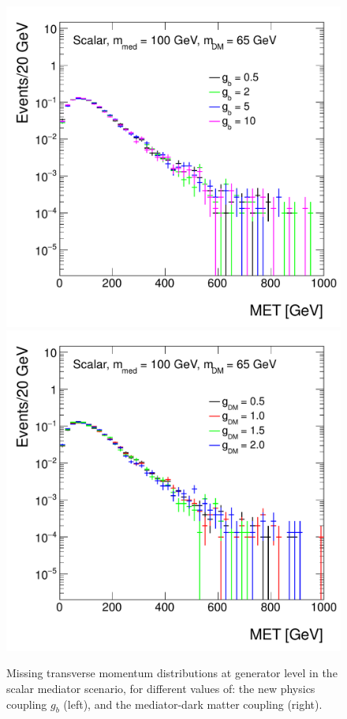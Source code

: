\begin{figure}[hbpt!]
	\begin{center}
		\includegraphics[width=0.75\linewidth]{figures/EW/monoH/s_gb_65_100_04_MET_et_Log}\\
		\includegraphics[width=0.75\linewidth]{figures/EW/monoH/s_gdm_MET_et_Log}
		\caption{Missing transverse momentum distributions at generator level in the scalar 
			mediator scenario, for different values of: the new physics coupling $g_b$ (left),
			and the mediator-dark matter coupling \gDM (right).
			\label{fig:metScalarCoupling}}
	\end{center}
\end{figure}

